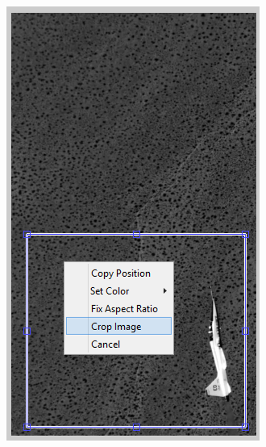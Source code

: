 \documentclass[letterpaper,12pt]{article}
\begin{document}
\begin{figure}[h]
    \centering
    \begin{subfigure}[b]{0.35\textwidth}
        \includegraphics[width=\textwidth]{Crop_Image.PNG}
        \caption{}
        \label{fig:Crop_Image}
    \end{subfigure}
    \begin{subfigure}[b]{0.35\textwidth}

\end{subfigure}
\end{figure}
\end{document}
